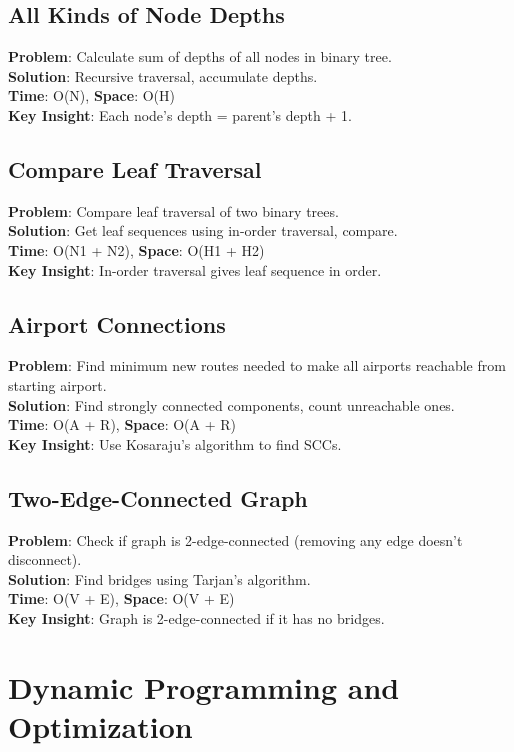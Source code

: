 \documentclass{report}
\begin{document}
\subsection{All Kinds of Node Depths}
\textbf{Problem}: Calculate sum of depths of all nodes in binary tree.\\
\textbf{Solution}: Recursive traversal, accumulate depths.\\
\textbf{Time}: O(N), \textbf{Space}: O(H)\\
\textbf{Key Insight}: Each node's depth = parent's depth + 1.

\subsection{Compare Leaf Traversal}
\textbf{Problem}: Compare leaf traversal of two binary trees.\\
\textbf{Solution}: Get leaf sequences using in-order traversal, compare.\\
\textbf{Time}: O(N1 + N2), \textbf{Space}: O(H1 + H2)\\
\textbf{Key Insight}: In-order traversal gives leaf sequence in order.

\subsection{Airport Connections}
\textbf{Problem}: Find minimum new routes needed to make all airports reachable from starting airport.\\
\textbf{Solution}: Find strongly connected components, count unreachable ones.\\
\textbf{Time}: O(A + R), \textbf{Space}: O(A + R)\\
\textbf{Key Insight}: Use Kosaraju's algorithm to find SCCs.

\subsection{Two-Edge-Connected Graph}
\textbf{Problem}: Check if graph is 2-edge-connected (removing any edge doesn't disconnect).\\
\textbf{Solution}: Find bridges using Tarjan's algorithm.\\
\textbf{Time}: O(V + E), \textbf{Space}: O(V + E)\\
\textbf{Key Insight}: Graph is 2-edge-connected if it has no bridges.

\section{Dynamic Programming and Optimization}
\end{document}
